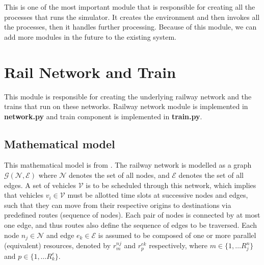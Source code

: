 \begin{enumerate}
This is one of the most important module that is responsible for creating all the processes 
that runs the simulator. It creates the environment and then invokes all the processes, then it handles 
further processing. Because of this module, we can add more modules in the future to the existing system.

\end{enumerate}

\section{Rail Network and Train}

This module is responsible for creating the underlying railway network and the trains that run on 
these networks. Railway network module is implemented in \textbf{network.py} and train component is implemented in 
\textbf{train.py}.
\vspace{0.5cm}
\subsection {Mathematical model}
This mathematical model is from \cite{ARTICLE:2}. The railway network is modelled as a graph
$ \mathcal{G}( \mathcal{N} ,\mathcal{E})$ where $\mathcal{N}$ denotes the set of all nodes, and 
$\mathcal{E}$ denotes
the set of all edges. A set of vehicles $\mathcal{V}$ is to be scheduled
through this network, which implies that vehicles $v_i \in \mathcal{V}$
must be allotted time slots at successive nodes and edges,
such that they can move from their respective origins to
destinations via predefined routes (sequence of nodes). Each
pair of nodes is connected by at most one edge, and thus
routes also define the sequence of edges to be traversed.
Each node $n_j \in \mathcal{N}$ and edge $e_k \in \mathcal{E}$ is assumed to be
composed of one or more parallel (equivalent) resources,
denoted by $r_{m}^{nj}$ and $r_{p}^{ek}$ respectively, where $m \in \{1, \ldots R^{n}_{j}\}$
and $p \in \{1, \ldots R^{e}_{k}\}$.

